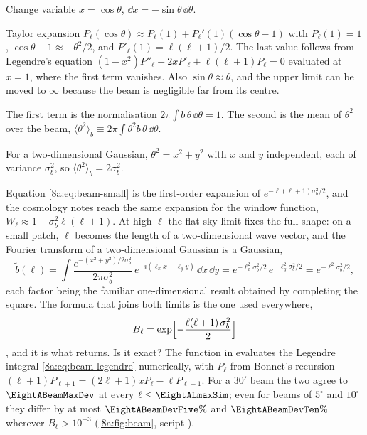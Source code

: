 \begin{explain}
  \item Change variable $x=\cos\theta$, $\dd x=-\sin\theta\,\dd\theta$.
  \item Taylor expansion $P_\ell(\cos\theta)\approx P_\ell(1)+P_\ell'(1)(\cos\theta-1)$ with
        $P_\ell(1)=1$, $\cos\theta-1\approx-\theta^2/2$, and $P'_\ell(1)=\ell(\ell+1)/2$. The
        last value follows from Legendre's equation $(1-x^2)P''_\ell-2xP'_\ell+\ell(\ell+1)P_\ell=0$
        evaluated at $x=1$, where the first term vanishes. Also $\sin\theta\approx\theta$, and the
        upper limit can be moved to $\infty$ because the beam is negligible far from its centre.
  \item The first term is the normalisation $2\pi\int b\,\theta\,\dd\theta=1$. The second is
        the mean of $\theta^2$ over the beam, $\langle\theta^2\rangle_b\equiv2\pi\int\theta^2 b\,\theta\,\dd\theta$.
  \item For a two-dimensional Gaussian, $\theta^2=x^2+y^2$ with $x$ and $y$ independent, each of
        variance $\sigma_b^2$, so $\langle\theta^2\rangle_b=2\sigma_b^2$.
\end{explain}
Equation \eqref{8a:eq:beam-small} is the first-order expansion of
$e^{-\ell(\ell+1)\sigma_b^2/2}$, and the cosmology notes reach the same expansion for the
window function, $W_\ell\approx1-\sigma_b^2\ell(\ell+1)$. At high $\ell$ the flat-sky limit
fixes the full shape: on a small patch, $\ell$ becomes the length of a two-dimensional wave
vector, and the Fourier transform of a two-dimensional Gaussian is a Gaussian,
\begin{equation}
  \tilde b(\bm\ell)=\int\frac{e^{-(x^2+y^2)/2\sigma_b^2}}{2\pi\sigma_b^2}\,
  e^{-i(\ell_xx+\ell_yy)}\,\dd x\,\dd y
  =e^{-\ell_x^2\sigma_b^2/2}\,e^{-\ell_y^2\sigma_b^2/2}=e^{-\ell^2\sigma_b^2/2},
  \label{8a:eq:beam-flat}
\end{equation}
each factor being the familiar one-dimensional result obtained by completing the square.
The formula that joins both limits is the one used everywhere,
\begin{equation}
  B_\ell=\exp\Bigl[-\frac{\ell(\ell+1)\,\sigma_b^2}{2}\Bigr]
  \label{8a:eq:beam}
\end{equation}
\cite{Knox1995}, and it is what  returns. Is it exact? The
function  in  evaluates the
Legendre integral \eqref{8a:eq:beam-legendre} numerically, with $P_\ell$ from Bonnet's
recursion $(\ell+1)P_{\ell+1}=(2\ell+1)xP_\ell-\ell P_{\ell-1}$. For a $30'$ beam the two
agree to $\EightABeamMaxDev$ at every $\ell\le\EightALmaxSim$; even for beams of $5^\circ$ and
$10^\circ$ they differ by at most $\EightABeamDevFive\%$ and $\EightABeamDevTen\%$ wherever
$B_\ell>10^{-3}$ (\cref{8a:fig:beam}, script ).


